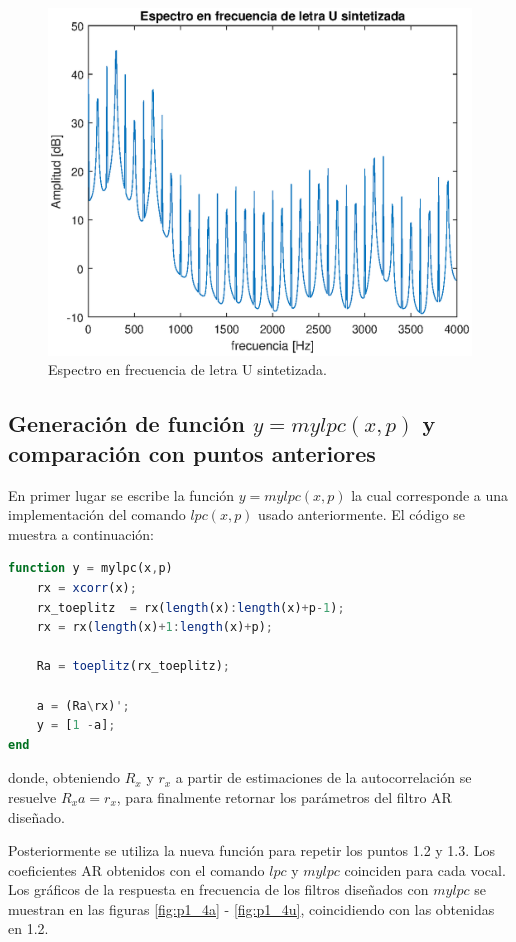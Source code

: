 \begin{figure}[H]
    \centering
    \includegraphics[width = .8\linewidth]{figures/p1_3u.eps}
    \caption{Espectro en frecuencia de letra U sintetizada.}
    \label{fig:p1_3u}
\end{figure}

\subsection{Generación de función $y = mylpc(x,p)$ y comparación con puntos anteriores}

En primer lugar se escribe la función $y=mylpc(x,p)$ la cual corresponde a una implementación del comando $lpc(x,p)$ usado anteriormente. El código se muestra a continuación:
\begin{lstlisting}[language = octave]
function y = mylpc(x,p)
    rx = xcorr(x);    
    rx_toeplitz  = rx(length(x):length(x)+p-1);
    rx = rx(length(x)+1:length(x)+p);

    Ra = toeplitz(rx_toeplitz);

    a = (Ra\rx)';
    y = [1 -a];
end
\end{lstlisting}

donde, obteniendo $R_x$ y $r_x$ a partir de estimaciones de la autocorrelación se resuelve $R_xa = r_x$, para finalmente retornar los parámetros del filtro AR diseñado.

Posteriormente se utiliza la nueva función para repetir los puntos 1.2 y 1.3. Los coeficientes AR obtenidos con el comando $lpc$ y $mylpc$ coinciden para cada vocal. Los gráficos de la respuesta en frecuencia de los filtros diseñados con $mylpc$ se muestran en las figuras \ref{fig:p1_4a} - \ref{fig:p1_4u}, coincidiendo con las obtenidas en 1.2.


